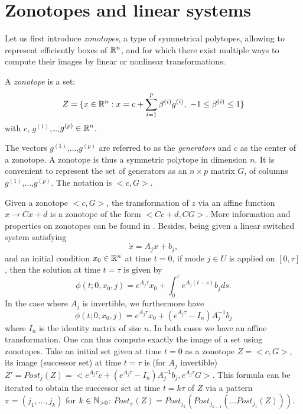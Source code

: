 \section{Zonotopes and linear systems}
\label{chap:1.1}

Let us first introduce {\em zonotopes}, a type of symmetrical polytopes, allowing to represent 
efficiently boxes of $\mathbb{R}^n$, and for which there exist multiple ways to compute
their images by linear or nonlinear transformations.

\begin{definition}

  A {\em zonotope} is a set:
  $$ Z = \{ x \in \mathbb{R}^n : x = c + \sum_{i= 1}^p \beta^{(i)} g^{(i)}, \ -1 \leq \beta^{(i)} \leq 1 \}$$
with $c$, $g^{(1)}$,\dots,$g^{(p)} \in \mathbb{R}^n$. 
 \label{def:zonotope}
\end{definition}

The vectors $g^{(1)}$,$\dots$,$g^{(p)}$ are referred to as the {\em generators} and $c$ 
as the center of a zonotope. A zonotope is thus a symmetric polytope in dimension $n$. 
It is convenient to represent the set of generators as an $n \times p$ matrix $G$, of columns
$g^{(1)}$,$\dots$,$g^{(p)}$. The notation is $< c,G>$. 

Given a zonotope $< c , G>$, the transformation of $z$ via an affine function 
$ x \longrightarrow C x + d$ is a zonotope of the form $< Cc + d, CG >$.
More information and properties on zonotopes can be found in \cite{???}. 
Besides, 
being given a linear switched system satisfying 
$$ \dot x = A_j x + b_j,$$ and an initial condition $x_0 \in \mathbb{R}^n$ at time $t = 0$,
if mode $j \in U$ is applied on $[ 0 , \tau]$, then 
the solution at time $t = \tau$ is given by
$$ \phi (t;0,x_0,j) = e^{A_j \tau} x_0 +   \int_0^\tau e^{A_j (t-s)} b_j ds. $$
In the case where $A_j$ is invertible, we furthermore have
$$ \phi (t;0,x_0,j) = e^{A_j \tau} x_0 +   ( e^{A_j \tau} - I_n ) A_j ^{-1} b_j$$
where $I_n$ is the identity matrix of size $n$.
In both cases we have an affine transformation.   
One can thus compute exactly the image of a set using zonotopes.
Take an initial set given at time $t=0$ as a zonotope $Z = <c,G>$, 
its image (successor set) at time $t = \tau$ is (for $A_j$ invertible) 
$Z' = Post_j(Z) =  < e^{A_j \tau} c +   ( e^{A_j \tau} - I_n ) A_j ^{-1} b_j, e^{A_j \tau} G>$.
This formula can be iterated to obtain the successor set at time $t = k \tau$ of $Z$
via a pattern $\pi = (j_1, \dots, j_k)$ for $k \in \mathbb{N}_{>0}$:
$ Post_\pi (Z) = Post_{j_k} (Post_{j_{k-1}} ( \dots Post_{j_1} (Z)))$.

